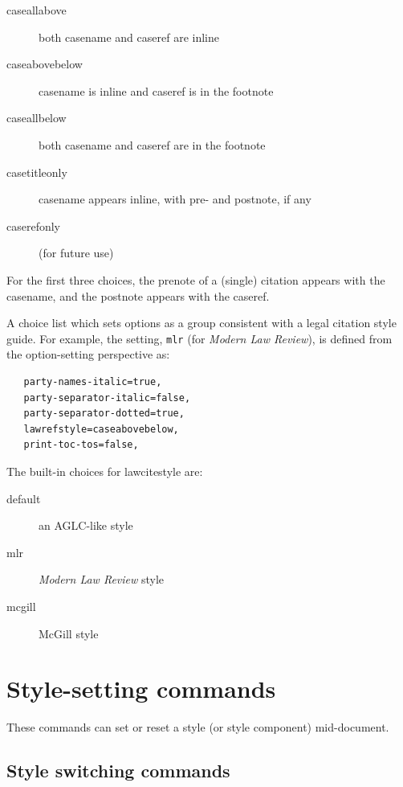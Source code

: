 \begin{description}
\item[caseallabove] both casename and caseref are inline
\item[caseabovebelow] casename is inline and caseref is in the footnote
\item[caseallbelow] both casename and caseref are in the footnote
\item[casetitleonly] casename appears inline, with pre- and postnote, if any%
\item[caserefonly] (for future use)
\end{description}


For the first three choices, the prenote of a (single) citation appears with the casename, and the postnote appears with the caseref.
\bigskip



A choice list which sets options as a group consistent with a legal citation style guide. For example, the setting, \texttt{mlr} (for \textit{Modern Law Review}), is defined from the option-setting perspective as:

\begin{verbatim}
   party-names-italic=true,
   party-separator-italic=false,
   party-separator-dotted=true,
   lawrefstyle=caseabovebelow,
   print-toc-tos=false,
\end{verbatim}	
	
The built-in choices for lawcitestyle are:

\begin{description}
\item[default] an AGLC-like style
\item[mlr] \textit{Modern Law Review} style
\item[mcgill] McGill style
\end{description}	
	
	
\section{Style-setting commands}
These commands can set or reset a style (or style component) mid-document.

\subsection{Style switching commands}


